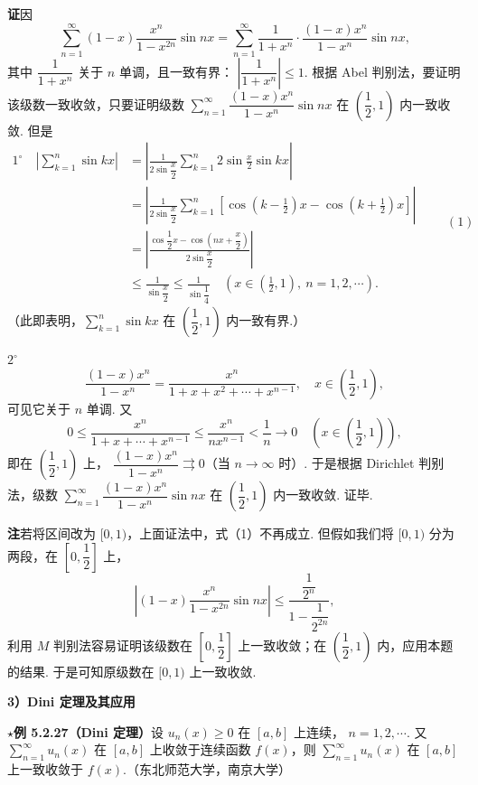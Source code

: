 \documentclass[UTF8, 12pt, fontset=fandol, oneside]{ctexart}
\begin{document}
\noindent\textbf{证}\quad 因
\[
  \sum_{n=1}^{\infty}(1-x)\frac{x^n}{1-x^{2n}}\sin nx
  =\sum_{n=1}^{\infty}\frac1{1+x^n}\cdot\frac{(1-x)x^n}{1-x^n}\sin nx,
\]
其中 $\dfrac1{1+x^n}$ 关于 $n$ 单调，且一致有界：
$\left|\dfrac1{1+x^n}\right|\le1$. 根据 Abel 判别法，要证明该级数一致收敛，只要证明级数
$\displaystyle\sum_{n=1}^{\infty}\dfrac{(1-x)x^n}{1-x^n}\sin nx$
在 $\left(\dfrac12,1\right)$ 内一致收敛. 但是
\[
\begin{aligned}
1^\circ\quad
\left|\sum_{k=1}^{n}\sin kx\right|
&=\left|\frac1{2\sin\dfrac{x}{2}}\sum_{k=1}^{n}2\sin\frac{x}{2}\sin kx\right|\\
&=\left|\frac1{2\sin\dfrac{x}{2}}\sum_{k=1}^{n}\left[\cos\left(k-\frac12\right)x-\cos\left(k+\frac12\right)x\right]\right|\\
&=\left|\frac{\cos\dfrac12x-\cos\left(nx+\dfrac{x}{2}\right)}{2\sin\dfrac{x}{2}}\right|\\
&\le\frac1{\sin\dfrac{x}{2}}\le\frac1{\sin\dfrac14}\quad
\left(x\in\left(\frac12,1\right),\ n=1,2,\cdots\right).
\end{aligned}
\qquad(1)
\]
（此即表明，$\displaystyle\sum_{k=1}^{n}\sin kx$ 在 $\left(\dfrac12,1\right)$ 内一致有界.）

$2^\circ$
\[
  \frac{(1-x)x^n}{1-x^n}
  =\frac{x^n}{1+x+x^2+\cdots+x^{n-1}},\quad x\in\left(\frac12,1\right),
\]
可见它关于 $n$ 单调. 又
\[
  0\le\frac{x^n}{1+x+\cdots+x^{n-1}}
  \le\frac{x^n}{nx^{n-1}}<\frac1n\to0
  \quad\left(x\in\left(\frac12,1\right)\right),
\]
即在 $\left(\dfrac12,1\right)$ 上，
$\dfrac{(1-x)x^n}{1-x^n}\rightrightarrows0$（当 $n\to\infty$ 时）. 于是根据 Dirichlet 判别法，级数
$\displaystyle\sum_{n=1}^{\infty}\dfrac{(1-x)x^n}{1-x^n}\sin nx$
在 $\left(\dfrac12,1\right)$ 内一致收敛. 证毕.

\noindent\textbf{注}\quad 若将区间改为 $[0,1)$，上面证法中，式（1）不再成立. 但假如我们将 $[0,1)$ 分为两段，在
$\left[0,\dfrac12\right]$ 上，
\[
  \left|(1-x)\frac{x^n}{1-x^{2n}}\sin nx\right|
  \le\frac{\dfrac1{2^n}}{1-\dfrac1{2^{2n}}},
\]
利用 $M$ 判别法容易证明该级数在 $\left[0,\dfrac12\right]$ 上一致收敛；在
$\left(\dfrac12,1\right)$ 内，应用本题的结果. 于是可知原级数在 $[0,1)$ 上一致收敛.

\noindent\textbf{3）Dini 定理及其应用}

\noindent\textbf{$\star$例 5.2.27（Dini 定理）}\quad 设 $u_n(x)\ge0$ 在 $[a,b]$ 上连续，
$n=1,2,\cdots$. 又 $\displaystyle\sum_{n=1}^{\infty}u_n(x)$ 在 $[a,b]$ 上收敛于连续函数
$f(x)$，则 $\displaystyle\sum_{n=1}^{\infty}u_n(x)$ 在 $[a,b]$ 上一致收敛于 $f(x)$.（东北师范大学，南京大学）
\end{document}
